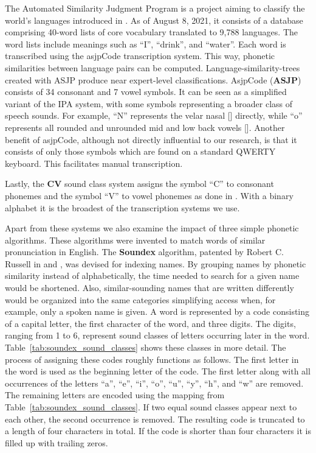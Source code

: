 The Automated Similarity Judgment Program is a project aiming to classify the world's languages introduced in \cite{brown2008asjpCode}.
As of August 8, 2021, it consists of a database comprising 40-word lists of core vocabulary translated to 9,788 languages.
The word lists include meanings such as ``I'', ``drink'', and ``water''.
Each word is transcribed using the asjpCode transcription system.
This way, phonetic similarities between language pairs can be computed.
Language-similarity-trees created with ASJP produce near expert-level classifications.
AsjpCode (\textbf{ASJP}) consists of 34 consonant and 7 vowel symbols.
It can be seen as a simplified variant of the IPA system, with some symbols representing a broader class of speech sounds.
For example, ``N'' represents the velar nasal [] directly, while ``o'' represents all rounded and unrounded mid and low back vowels [].
Another benefit of asjpCode, although not directly influential to our research, is that it consists of only those symbols which are found on a standard QWERTY keyboard.
This facilitates manual transcription.

Lastly, the \textbf{CV} sound class system assigns the symbol ``C'' to consonant phonemes and the symbol ``V'' to vowel phonemes as done in \cite{list2017lingpy}.
With a binary alphabet it is the broadest of the transcription systems we use.\newline

Apart from these systems we also examine the impact of three simple phonetic algorithms.
These algorithms were invented to match words of similar pronunciation in English.
The \textbf{Soundex} algorithm, patented by Robert C. Russell in \citeyear{russel1918soundex} and \citeyear{russel1922soundex}, was devised for indexing names.
By grouping names by phonetic similarity instead of alphabetically, the time needed to search for a given name would be shortened.
Also, similar-sounding names that are written differently would be organized into the same categories simplifying access when, for example, only a spoken name is given.
A word is represented by a code consisting of a capital letter, the first character of the word, and three digits.
The digits, ranging from 1 to 6, represent sound classes of letters occurring later in the word.
Table~\ref{tab:soundex_sound_classes} shows these classes in more detail.
The process of assigning these codes roughly functions as follows.
The first letter in the word is used as the beginning letter of the code.
The first letter along with all occurrences of the letters ``a'', ``e'', ``i'', ``o'', ``u'', ``y'', ``h'', and ``w'' are removed.
The remaining letters are encoded using the mapping from Table~\ref{tab:soundex_sound_classes}.
If two equal sound classes appear next to each other, the second occurrence is removed.
The resulting code is truncated to a length of four characters in total.
If the code is shorter than four characters it is filled up with trailing zeros.

